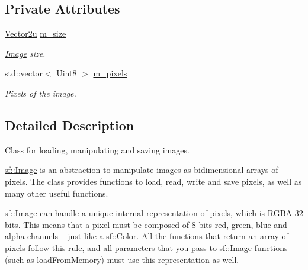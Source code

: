\subsection*{Private Attributes}
\begin{DoxyCompactItemize}
\item 
\mbox{\label{classsf_1_1_image_a4cdfbac3fe04c8bc764b8a0082e77a28}} 
\mbox{\hyperlink{classsf_1_1_vector2}{Vector2u}} \mbox{\hyperlink{classsf_1_1_image_a4cdfbac3fe04c8bc764b8a0082e77a28}{m\+\_\+size}}
\begin{DoxyCompactList}\small\item\em \mbox{\hyperlink{classsf_1_1_image}{Image}} size. \end{DoxyCompactList}\item 
\mbox{\label{classsf_1_1_image_af8081b1a84cf6660425a5ca7ea0ab619}} 
std\+::vector$<$ Uint8 $>$ \mbox{\hyperlink{classsf_1_1_image_af8081b1a84cf6660425a5ca7ea0ab619}{m\+\_\+pixels}}
\begin{DoxyCompactList}\small\item\em Pixels of the image. \end{DoxyCompactList}\end{DoxyCompactItemize}


\subsection{Detailed Description}
Class for loading, manipulating and saving images. 

\begin{DoxyVerb}\end{DoxyVerb}


\mbox{\hyperlink{classsf_1_1_image}{sf\+::\+Image}} is an abstraction to manipulate images as bidimensional arrays of pixels. The class provides functions to load, read, write and save pixels, as well as many other useful functions.

\mbox{\hyperlink{classsf_1_1_image}{sf\+::\+Image}} can handle a unique internal representation of pixels, which is R\+G\+BA 32 bits. This means that a pixel must be composed of 8 bits red, green, blue and alpha channels -- just like a \mbox{\hyperlink{classsf_1_1_color}{sf\+::\+Color}}. All the functions that return an array of pixels follow this rule, and all parameters that you pass to \mbox{\hyperlink{classsf_1_1_image}{sf\+::\+Image}} functions (such as load\+From\+Memory) must use this representation as well.

